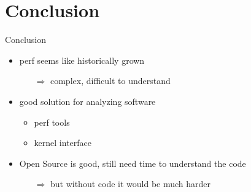 \section{Conclusion}
\begin{frame}{Conclusion}
\begin{itemize}
  \item perf seems like historically grown
  \begin{itemize}
    \item[$\Rightarrow$] complex, difficult to understand
  \end{itemize}
\pause
  \item good solution for analyzing software
  \begin{itemize}
    \item perf tools
    \item kernel interface
  \end{itemize}
\pause
  \item Open Source is good, still need time to understand the code
  \begin{itemize}
    \item[$\Rightarrow$] but without code it would be much harder
  \end{itemize}
\end{itemize}
\end{frame}




